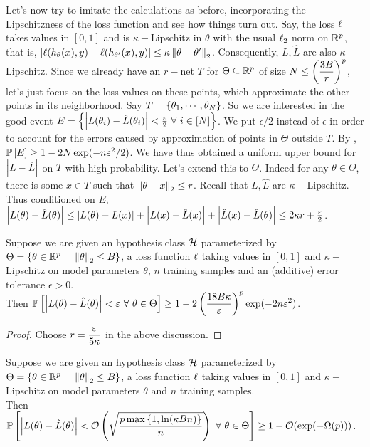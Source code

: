 Let's now try to imitate the calculations as before, incorporating the Lipschitzness of the loss function and see how things turn out. Say, the loss $\l$ takes values in $[0,1]$ and is $\kappa-$Lipschitz in $\theta$ with the usual $\l_{2}$ norm on $\R^{p}$, that is, $\abs{\l(h_{\theta}(x),y)-\l(h_{\theta'}(x),y)} \le \kappa \norm{\theta-\theta'}{2}$. Consequently, $L,\hat L$ are also $\kappa-$Lipschitz. Since we already have an $r-$net $T$ for $\Theta\subseteq \R^{p}$ of size $\ds N\le \left(\frac{3B}{r}\right)^{p}$, let's just focus on the loss values on these points, which approximate the other points in its neighborhood. Say $T = \set{\theta_{1},\cdots,\theta_{N}}$. So we are interested in the good event $E = \set{\abs{L(\theta_{i})-\hat L(\theta_{i})} < \frac{\epsilon}2 \fa i\in[N]}$. We put $\epsilon/2$ instead of $\epsilon$ in order to account for the errors caused by approximation of points in $\Theta$ outside $T$. By , $\P{E} \ge 1-2N\exp(-n\epsilon^{2}/2)$. We have thus obtained a uniform upper bound for $\abs{L-\hat L}$ on $T$ with high probability. Let's extend this to $\Theta$. Indeed for any $\theta\in \Theta$, there is some $x\in T$ such that $\norm{\theta-x}{2}\le r$. Recall that $L,\hat L$ are $\kappa-$Lipschitz. Thus conditioned on $E$, $\abs{L(\theta)-\hat L(\theta)} \le \abs{L(\theta)-L(x)} + \abs{L(x)-\hat L(x)} + \abs{\hat L(x)-\hat L(\theta)} \le 2\kappa r + \frac{\epsilon}2$. 

\begin{thm}
Suppose we are given an hypothesis class $\cH$ parameterized by $\Theta=\set{\theta \in\R^{p}\st \norm \theta2\le B}$, a loss function $\l$ taking values in $[0,1]$ and $\kappa-$Lipschitz on model parameters $\theta$, $n$ training samples and an (additive) error tolerance $\epsilon>0$.\\ 
Then $\ds \P{\abs{L(\theta)-\hat L(\theta)} < \epsilon\fa \theta\in \Theta} \ge 1 - 2\left(\frac{18B\kappa}{\epsilon}\right)^{p}\exp(-2n\epsilon^{2})$.
\end{thm}
\begin{proof}
Choose $\ds r = \frac{\epsilon}{5\kappa}$ in the above discussion.
\end{proof}

\begin{thm}
Suppose we are given an hypothesis class $\cH$ parameterized by $\Theta=\set{\theta \in\R^{p}\st \norm \theta2\le B}$, a loss function $\l$ taking values in $[0,1]$ and $\kappa-$Lipschitz on model parameters $\theta$ and $n$ training samples.\\ 
Then $\ds \P{\abs{L(\theta)-\hat L(\theta)} < \cO\left(\sqrt{\frac{p \max\set{1,\ln(\kappa Bn)}}{n}}\right)\fa \theta\in \Theta} \ge 1 - \cO(\exp(-\Omega(p)))$.
\end{thm}

